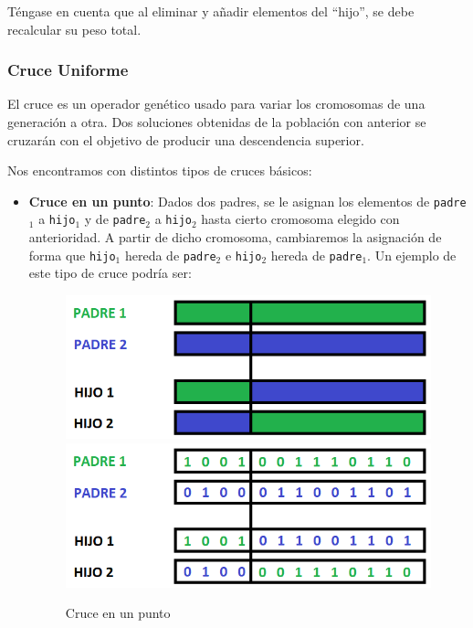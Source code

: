 Téngase en cuenta que al eliminar y añadir elementos del ``hijo'', se debe recalcular su peso total.

\subsubsection{Cruce Uniforme}

El cruce es un operador genético usado para variar los cromosomas de una generación a otra. 
Dos soluciones obtenidas de la población con anterior se cruzarán con el objetivo de producir una descendencia superior. 

Nos encontramos con distintos tipos de cruces básicos:
\begin{itemize}
	\item \textbf{Cruce en un punto}:  Dados dos padres, se le asignan los elementos de \texttt{padre$_1$} a \texttt{hijo$_1$} y de \texttt{padre$_2$} a \texttt{hijo$_2$} hasta cierto cromosoma elegido con anterioridad. 
A partir de dicho cromosoma, cambiaremos la asignación de forma que \texttt{hijo$_1$} hereda de \texttt{padre$_2$} e \texttt{hijo$_2$} hereda de \texttt{padre$_1$}. 
Un ejemplo de este tipo de cruce podría ser:

\begin{figure}[H]
		\centering
		\includegraphics[scale=0.5]{imagenes/Crossover1point.png}
		\includegraphics[scale=0.5]{imagenes/Crossover1pointNumber.png}
        \caption{Cruce en un punto}
        \label{fig:Crossover1}
\end{figure}


\end{itemize}
